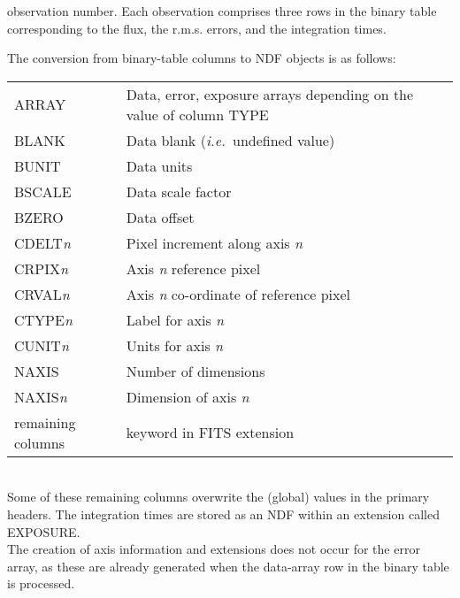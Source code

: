 \documentclass[twoside,11pt]{article}
\newcommand{\sstitem}{\item}
\newcommand{\sstitem}{\item}
\begin{document}
{{{{            observation number.
            Each observation comprises three rows in the binary table
            corresponding to the flux, the r.m.s. errors, and the integration
            times.
            \sstitem
            The conversion from binary-table columns to NDF objects is as
            follows:
            \\[\medskipamount]
            \begin{tabular}{lp{90mm}}
            ARRAY              &   Data, error, exposure arrays depending
                                   on the value of column TYPE \\
            BLANK              &   Data blank (\textit{i.e.}\ undefined value) \\
            BUNIT              &   Data units \\
            BSCALE             &   Data scale factor \\
            BZERO              &   Data offset \\
            CDELT\textit{n}           &   
             Pixel increment along axis \textit{n} \\
            CRPIX\textit{n}           &   Axis \textit{n} reference pixel \\
            CRVAL\textit{n}           &   
             Axis \textit{n} co-ordinate of reference pixel \\
            CTYPE\textit{n}           &   Label for axis \textit{n} \\
            CUNIT\textit{n}           &   Units for axis \textit{n} \\
            NAXIS              &   Number of dimensions \\
            NAXIS\textit{n}           &   Dimension of axis \textit{n} \\
            remaining columns  &   keyword in FITS extension \\
            \end{tabular}
            \\[\medskipamount]
            Some of these remaining columns overwrite the (global) values
            in the primary headers.  The integration times are stored as
            an NDF within an extension called EXPOSURE.
            \\[\medskipamount]
            The creation of axis information and extensions does not occur
            for the error array, as these are already generated when the
            data-array row in the binary table is processed.
}}}}
\end{document}
